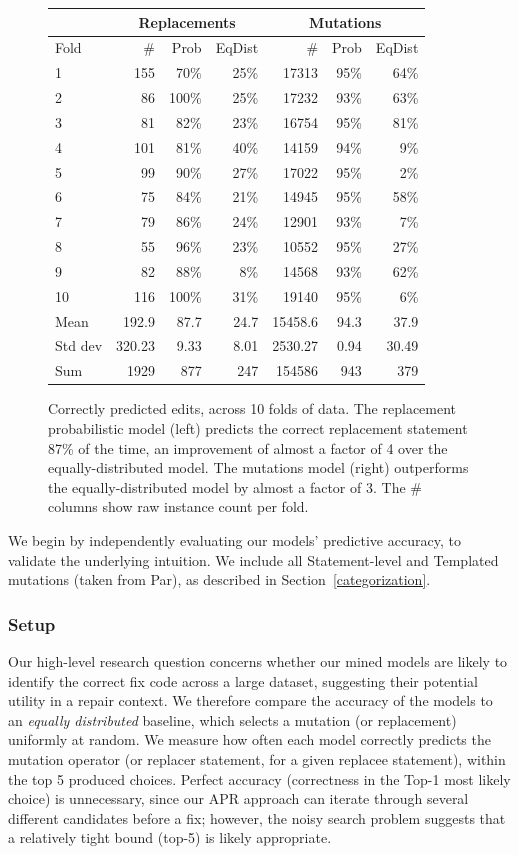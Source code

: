\documentclass[conference]{IEEEtran}
\begin{document}
\begin{figure}[ht]
{\footnotesize
{\centering
\begin{tabular}{l|rrr|rrr}
\toprule
   &\multicolumn{3}{c|}{Replacements} &\multicolumn{3}{c}{Mutations} \\
\midrule
Fold	& \# &Prob& EqDist& \# &Prob& EqDist \\
\midrule
1	& 155&70\%&	25\% &17313&  95\% & 64\%   \\
2	& 86&100\%&	25\%  & 17232& 93\% & 63\%   \\
3	& 81&82\%	&23\%  & 16754& 95\% & 81\% \\
4	& 101&81\%	&40\%  & 14159& 94\% & 9\%   \\
5	& 99&90\%	&27\%  & 17022& 95\% & 2\%  \\
6	& 75&84\%	&21\%  & 14945& 95\%& 58\%  \\
7	& 79&86\%	&24\%  & 12901& 93\%& 7\%  \\
8	& 55&96\%	&23\%  & 10552& 95\%& 27\%  \\
9	& 82&88\%	&8\%  & 14568& 93\%& 62\% \\
10	& 116&100\%	&31\% & 19140 & 95\% & 6\% \\
\midrule
Mean	& 192.9 &87.7	&24.7& 15458.6  & 94.3 & 37.9  \\
\midrule
Std dev	& 320.23&9.33&	8.01 & 2530.27 & 0.94 & 30.49   \\
\midrule
Sum & 1929&877 & 247 &  154586& 943 & 379  \\
\bottomrule
\end{tabular}
\center
  \caption{Correctly predicted edits, across 10 folds of data.
The replacement probabilistic model (left) predicts
    the correct replacement statement 87\% of the time,
    an improvement of almost a factor of 4 over the equally-distributed model. 
    The mutations model (right) outperforms the equally-distributed model by 
    almost a factor of 3. The \# columns show raw instance count per fold. \label{results10fcv}} 
}}
\end{figure} 


We begin by independently evaluating our models' predictive accuracy, to
validate the underlying intuition.  We include all Statement-level and Templated
mutations (taken from Par), as described in Section~\ref{categorization}.

\subsubsection{Setup}
Our high-level research question concerns whether 
our mined models are likely to identify the correct fix code across a large
dataset, suggesting their potential utility in a repair context.  We therefore
compare the accuracy of the models to an \emph{equally distributed} baseline,
which selects a mutation (or replacement) uniformly at random. 
We measure how often each model correctly predicts the mutation operator (or
replacer statement, for a given replacee statement), within the top 5 produced
choices. Perfect accuracy (correctness in the Top-1 most likely choice) is
unnecessary, since our APR approach can iterate through several
different candidates before a fix; 
however, the noisy search problem suggests that a relatively tight bound (top-5)
is likely appropriate.
\end{document}
